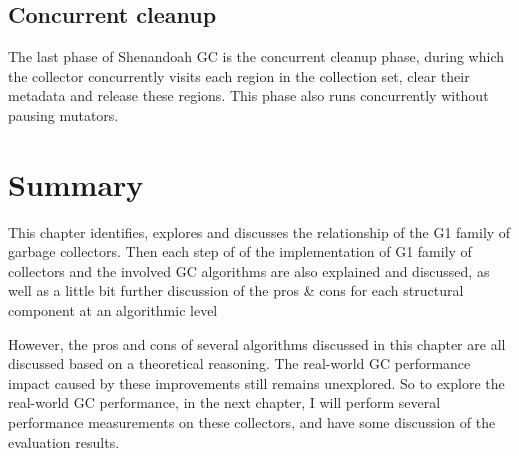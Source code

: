 \subsection{Concurrent cleanup}

The last phase of Shenandoah GC is the concurrent cleanup phase, during which the
collector concurrently visits each region in the collection set, clear their metadata
and release these regions. This phase also runs concurrently without pausing mutators.



\section{Summary}

This chapter identifies, explores and discusses the relationship of the G1 family of garbage collectors.
Then each step of of the implementation of G1 family of collectors and the involved GC algorithms
are also explained and discussed, as well as a little bit further discussion of the
pros \& cons for each structural component at an algorithmic level

However, the pros and cons of several algorithms discussed in this chapter are
all discussed based on a theoretical reasoning.
The real-world GC performance impact caused by these improvements still remains unexplored.
So to explore the real-world GC performance, in the next chapter, I will perform several performance
measurements on these collectors, and have some discussion of the evaluation results.



